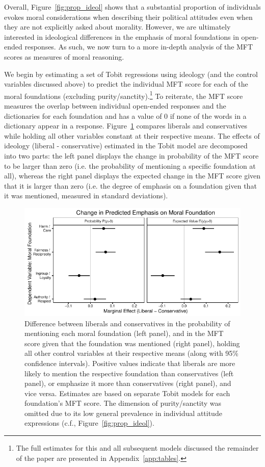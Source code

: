 \documentclass[12pt]{article}
\begin{document}
Overall, Figure~\ref{fig:prop_ideol} shows that a substantial proportion of individuals evokes moral considerations when describing their political attitudes even when they are not explicitly asked about morality. However, we are ultimately interested in ideological differences in the emphasis of moral foundations in open-ended responses. As such, we now turn to a more in-depth analysis of the MFT scores as measures of moral reasoning.

We begin by estimating a set of Tobit regressions using ideology (and the control variables discussed above) to predict the individual MFT score for each of the moral foundations (excluding purity/sanctity).\footnote{The full estimates for this and all subsequent models discussed the remainder of the paper are presented in Appendix~\ref{app:tables}.} To reiterate, the MFT score measures the overlap between individual open-ended responses and the dictionaries for each foundation and has a value of 0 if none of the words in a dictionary appear in a response. Figure~\ref{fig:tobit_ideol} compares liberals and conservatives while holding all other variables constant at their respective means. The effects of ideology (liberal - conservative) estimated in the Tobit model are decomposed into two parts: the left panel displays the change in probability of the MFT score to be larger than zero (i.e. the probability of mentioning a specific foundation at all), whereas the right panel displays the expected change in the MFT score given that it is larger than zero (i.e. the degree of emphasis on a foundation given that it was mentioned, measured in standard deviations).

\begin{figure}[ht]\centering
\includegraphics{../calc/fig/tobit_ideol.pdf}
\caption{Difference between liberals and conservatives in the probability of mentioning each moral foundation (left panel), and in the MFT score given that the foundation was mentioned (right panel), holding all other control variables at their respective means (along with 95\% confidence intervals). Positive values indicate that liberals are more likely to mention the respective foundation than conservatives (left panel), or emphasize it more than conservatives (right panel), and vice versa. Estimates are based on separate Tobit models for each foundation's MFT score. The dimension of purity/sanctity was omitted due to its low general prevalence in individual attitude expressions (c.f., Figure~\ref{fig:prop_ideol}). %
}\label{fig:tobit_ideol}
\end{figure}
\end{document}
